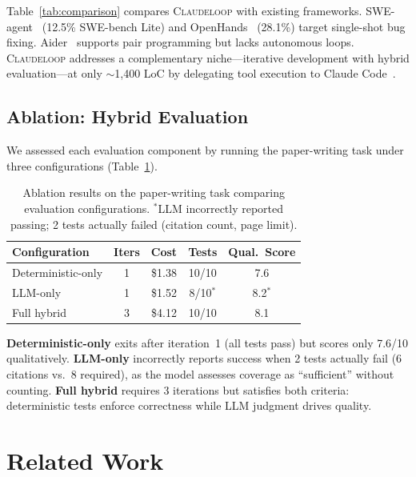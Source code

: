 \documentclass{article}
\begin{document}
Table~\ref{tab:comparison} compares \textsc{Claudeloop} with existing frameworks. SWE-agent~\cite{yang2024sweagent} (12.5\% SWE-bench Lite) and OpenHands~\cite{wang2024openhands} (28.1\%) target single-shot bug fixing. Aider~\cite{gauthier2024aider} supports pair programming but lacks autonomous loops. \textsc{Claudeloop} addresses a complementary niche---iterative development with hybrid evaluation---at only $\sim$1,400 LoC by delegating tool execution to Claude Code~\cite{anthropic2025claude}.

\subsection{Ablation: Hybrid Evaluation}

We assessed each evaluation component by running the paper-writing task under three configurations (Table~\ref{tab:ablation}).

\begin{table}[t]
\centering
\caption{Ablation results on the paper-writing task comparing evaluation configurations. $^*$LLM incorrectly reported passing; 2 tests actually failed (citation count, page limit).}
\label{tab:ablation}
\begin{tabular}{@{}lcccc@{}}
\toprule
\textbf{Configuration} & \textbf{Iters} & \textbf{Cost} & \textbf{Tests} & \textbf{Qual.\ Score} \\
\midrule
Deterministic-only & 1 & \$1.38 & 10/10 & 7.6 \\
LLM-only & 1 & \$1.52 & 8/10$^*$ & 8.2$^*$ \\
Full hybrid & 3 & \$4.12 & 10/10 & 8.1 \\
\bottomrule
\end{tabular}
\end{table}

\textbf{Deterministic-only} exits after iteration~1 (all tests pass) but scores only 7.6/10 qualitatively. \textbf{LLM-only} incorrectly reports success when 2 tests actually fail (6 citations vs.\ 8 required), as the model assesses coverage as ``sufficient'' without counting. \textbf{Full hybrid} requires 3 iterations but satisfies both criteria: deterministic tests enforce correctness while LLM judgment drives quality.

\section{Related Work}
\end{document}
